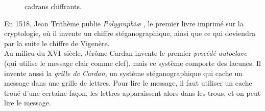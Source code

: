 \begin{figure}[h]
  \begin{center}
    \hspace{1.5cm}

  \end{center}
  \vspace{-10pt}
  \caption{cadrans chiffrants.}
  \vspace{-15pt}
\end{figure}

En 1518, Jean Trithème publie \emph{Polygraphi\ae} , le premier livre imprimé
sur la cryptologie, où il invente un chiffre stéganographique,
ainsi que ce
qui deviendra par la suite le chiffre de
Vigenère. \\

Au milieu du XVI\ieme~siècle, Jérôme Cardan invente le premier
\emph{procédé autoclave} (qui utilise le message clair comme clef),
mais ce système comporte des lacunes. Il invente aussi la \emph{grille
  de Cardan}, un système stéganographique qui cache un message dans
une grille de lettres. Pour lire le message, il faut utiliser un cache
troué d'une certaine façon, les lettres apparaissent alors dans les
trous, et on peut lire le message. \\

